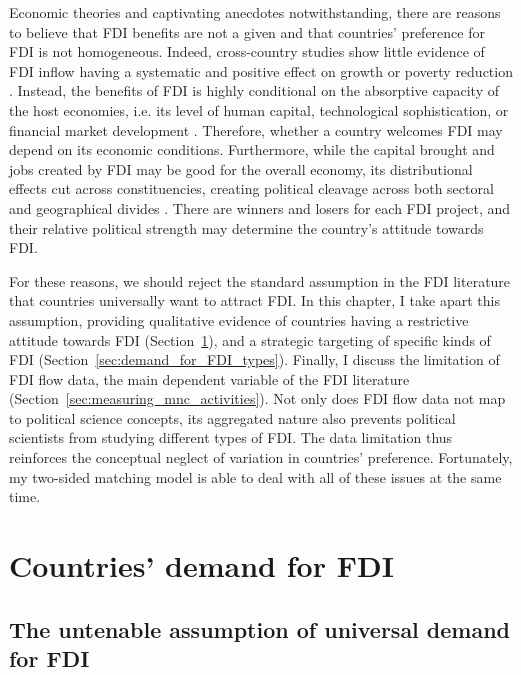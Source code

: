 Economic theories and captivating anecdotes notwithstanding, there are reasons
to believe that FDI benefits are not a given and that countries' preference for
FDI is not homogeneous. Indeed, cross-country studies show little evidence of
FDI inflow having a systematic and positive effect on growth
\citep{Nair-Reichert2001, Carkovic2002} or poverty reduction \citep{Gohou2012}.
Instead, the benefits of FDI is highly conditional on the absorptive capacity of
the host economies, i.e. its level of human capital, technological
sophistication, or financial market development \citep{Durham2004,
  Nunnenkamp2004, Fu2008, Willem2004}. Therefore, whether a country welcomes FDI
may depend on its economic conditions. Furthermore, while the capital brought
and jobs created by FDI may be good for the overall economy, its distributional
effects cut across constituencies, creating political cleavage across both
sectoral and geographical divides \citep{Chintrakarn2012, Goldberg2007,
  Nunnenkamp2007}. There are winners and losers for each FDI project, and their
relative political strength may determine the country's attitude towards FDI.

For these reasons, we should reject the standard assumption in the FDI
literature that countries universally want to attract FDI. In this chapter, I
take apart this assumption, providing qualitative evidence of countries having a
restrictive attitude towards FDI (Section~\ref{sec:demand_for_FDI}), and a
strategic targeting of specific kinds of FDI
(Section~\ref{sec:demand_for_FDI_types}). Finally, I discuss the limitation of
FDI flow data, the main dependent variable of the FDI literature
(Section~\ref{sec:measuring_mnc_activities}). Not only does FDI flow data not
map to political science concepts, its aggregated nature also prevents political
scientists from studying different types of FDI. The data limitation thus
reinforces the conceptual neglect of variation in countries' preference.
Fortunately, my two-sided matching model is able to deal with all of these
issues at the same time.

\section{Countries' demand for FDI}
\label{sec:demand_for_FDI}

\subsection{The untenable assumption of universal demand for FDI}

